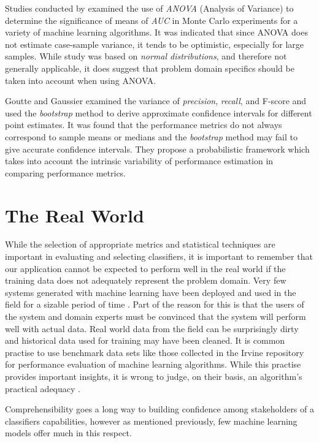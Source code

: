 \documentclass[10pt]{unbthesis}
\begin{document}
Studies conducted by \cite{RefWorks:38} examined
the use of \textit{ANOVA} (Analysis of Variance) to determine the
significance of means of \textit{AUC} in Monte Carlo experiments for a
variety of machine learning algorithms. It was indicated that since ANOVA does not
estimate case-sample variance, it tends to be 
optimistic, especially for large samples. While study was based on
\textit{normal distributions}, and therefore not generally applicable, it does
suggest that problem domain specifics should be taken into account
when using ANOVA.

Goutte and Gaussier \cite{RefWorks:40} examined the variance of
\textit{precision}, \textit{recall}, and {F-score} and used the
\textit{bootstrap} method to derive approximate confidence intervals
for different point estimates. It was found that the performance
metrics do not always correspond to sample means or medians and the
\textit{bootstrap} method may fail to give accurate confidence
intervals. They propose a probabilistic framework which takes into
account the intrinsic variability of performance estimation in
comparing performance metrics.


\section{The Real World}
While the selection of appropriate metrics and statistical techniques
are important in evaluating and selecting classifiers, it is important
to remember that our application cannot be expected to perform well in
the real world if the training data does not adequately represent the
problem domain. Very few systems generated with machine learning have
been deployed and used in the field for a sizable period of time
\cite{RefWorks:46}. Part of the reason for this is that the users of
the system and domain experts must be convinced that the system will
perform well with actual data. Real world data from the field can be
surprisingly dirty \cite{RefWorks:58} and historical data used for
training may have been cleaned. It is common practise to use benchmark
data sets like those collected in the Irvine repository
\cite{RefWorks:59} for performance evaluation of machine learning
algorithms. While this practise provides important insights, it is
wrong to judge, on their basis, an algorithm's practical adequacy
\cite{RefWorks:46}.

Comprehensibility goes a long way to building confidence among
stakeholders of a classifiers capabilities, however as mentioned
previously, few machine learning models offer much in this respect.
\end{document}
